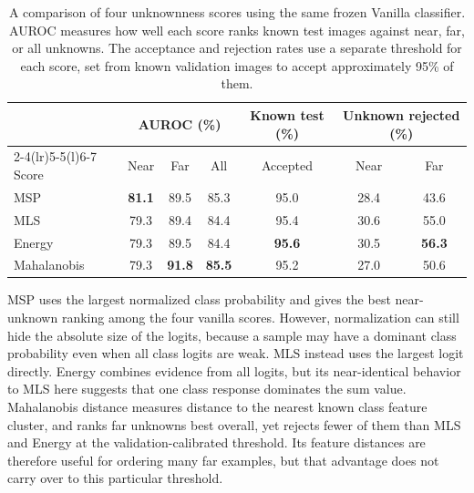 \documentclass{article}
\newcommand{\best}[1]{\textbf{#1}}
\begin{document}
\begin{table}[H]
\caption{A comparison of four unknownness scores using the same frozen Vanilla classifier. AUROC measures how well each score ranks known test images against near, far, or all unknowns. The acceptance and rejection rates use a separate threshold for each score, set from known validation images to accept approximately 95\% of them.}
\label{tab:scores}\centering\scriptsize\setlength{\tabcolsep}{4pt}
\begin{tabular}{@{}l*{6}{c}@{}}
\toprule
& \multicolumn{3}{c}{AUROC (\%)} & \multicolumn{1}{c}{Known test (\%)} & \multicolumn{2}{c}{Unknown rejected (\%)}\\
\cmidrule(lr){2-4}\cmidrule(lr){5-5}\cmidrule(l){6-7}
Score & Near & Far & All & Accepted & Near & Far\\
\midrule
MSP & \best{81.1} & 89.5 & 85.3 & 95.0 & 28.4 & 43.6\\
MLS & 79.3 & 89.4 & 84.4 & 95.4 & 30.6 & 55.0\\
Energy & 79.3 & 89.5 & 84.4 & \best{95.6} & 30.5 & \best{56.3}\\
Mahalanobis & 79.3 & \best{91.8} & \best{85.5} & 95.2 & 27.0 & 50.6\\
\bottomrule
\end{tabular}
\end{table}

MSP \citep{hendrycks2017baseline} uses the largest normalized class probability and gives the best near-unknown ranking among the four vanilla scores. However, normalization can still hide the absolute size of the logits, because a sample may have a dominant class probability even when all class logits are weak. MLS \citep{vaze2022osr} instead uses the largest logit directly. Energy \citep{liu2020energy} combines evidence from all logits, but its near-identical behavior to MLS here suggests that one class response dominates the sum value.
Mahalanobis distance \citep{lee2018mahalanobis} measures distance to the nearest known class feature cluster, and ranks far unknowns best overall, yet rejects fewer of them than MLS and Energy at the validation-calibrated threshold. Its feature distances are therefore useful for ordering many far examples, but that advantage does not carry over to this particular threshold.
\end{document}
